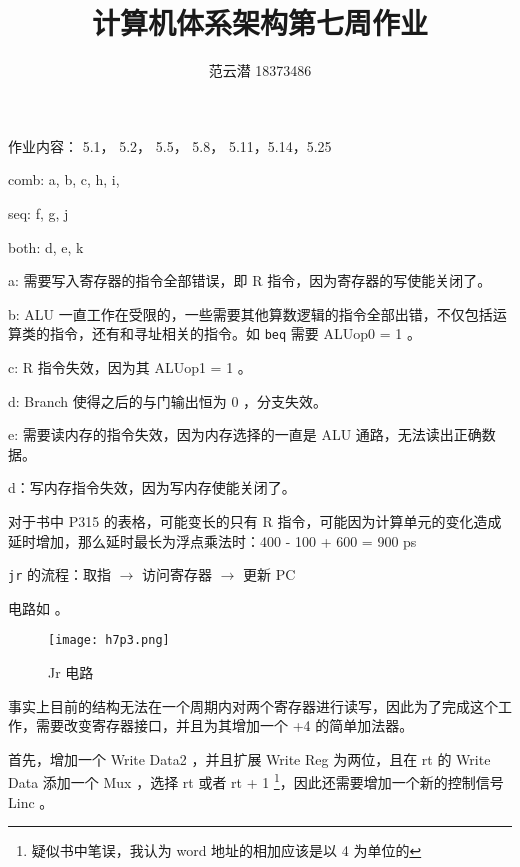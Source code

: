 \documentclass[lang=cn,11pt,a4paper,cite=authoryear,twocolumn]{elegantpaper}
\title{计算机体系架构\quad 第七周作业}
\author{范云潜 18373486}
\institute{微电子学院 184111 班}
\date{\zhtoday}
\begin{document}
\maketitle

作业内容： 	5.1， 5.2， 5.5， 5.8， 5.11，5.14，5.25	 



comb: a, b, c, h, i, 

seq: f, g, j

both: d, e, k


a: 需要写入寄存器的指令全部错误，即 R 指令，因为寄存器的写使能关闭了。

b: ALU 一直工作在受限的，一些需要其他算数逻辑的指令全部出错，不仅包括运算类的指令，还有和寻址相关的指令。如 \lstinline{beq} 需要 ALUop0 = 1 。

c: R 指令失效，因为其 ALUop1 = 1 。

d: Branch 使得之后的与门输出恒为 0 ，分支失效。

e: 需要读内存的指令失效，因为内存选择的一直是 ALU 通路，无法读出正确数据。

d：写内存指令失效，因为写内存使能关闭了。


对于书中 P315 的表格，可能变长的只有 R 指令，可能因为计算单元的变化造成延时增加，那么延时最长为浮点乘法时：400 - 100 + 600 = 900 ps 


\lstinline{jr} 的流程：取指 \(\rightarrow\) 访问寄存器 \(\rightarrow\) 更新 PC 

电路如  。


\begin{figure*}
    \centering
    \caption{Jr 电路}
    \texttt{[image: h7p3.png]}
    \label{01}
\end{figure*}


事实上目前的结构无法在一个周期内对两个寄存器进行读写，因此为了完成这个工作，需要改变寄存器接口，并且为其增加一个 +4 的简单加法器。

首先，增加一个 Write Data2 ，并且扩展 Write Reg 为两位，且在 rt 的 Write Data 添加一个 Mux ，选择 rt 或者 rt + 1 \footnote{疑似书中笔误，我认为 word 地址的相加应该是以 4 为单位的}，因此还需要增加一个新的控制信号 Linc 。

\end{document}
